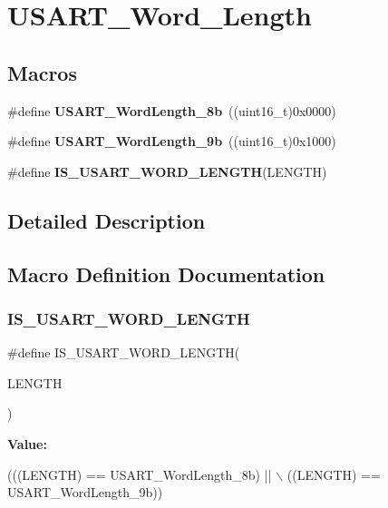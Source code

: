\hypertarget{group___u_s_a_r_t___word___length}{}\section{U\+S\+A\+R\+T\+\_\+\+Word\+\_\+\+Length}
\label{group___u_s_a_r_t___word___length}
\subsection*{Macros}
\begin{DoxyCompactItemize}
\item 
\mbox{\label{group___u_s_a_r_t___word___length_ga08682faddc657df85a93627b5a146c25}} 
\#define {\bfseries U\+S\+A\+R\+T\+\_\+\+Word\+Length\+\_\+8b}~((uint16\+\_\+t)0x0000)
\item 
\mbox{\label{group___u_s_a_r_t___word___length_gae7dd162142660e09e2321aa3f33dc4d2}} 
\#define {\bfseries U\+S\+A\+R\+T\+\_\+\+Word\+Length\+\_\+9b}~((uint16\+\_\+t)0x1000)
\item 
\#define {\bfseries I\+S\+\_\+\+U\+S\+A\+R\+T\+\_\+\+W\+O\+R\+D\+\_\+\+L\+E\+N\+G\+TH}(L\+E\+N\+G\+TH)
\end{DoxyCompactItemize}


\subsection{Detailed Description}


\subsection{Macro Definition Documentation}
\mbox{\label{group___u_s_a_r_t___word___length_ga5b07b29ee91f0bea4c10ec0fd74fbc04}} 
\subsubsection{\texorpdfstring{I\+S\+\_\+\+U\+S\+A\+R\+T\+\_\+\+W\+O\+R\+D\+\_\+\+L\+E\+N\+G\+TH}{IS\_USART\_WORD\_LENGTH}}
{\footnotesize\ttfamily \#define I\+S\+\_\+\+U\+S\+A\+R\+T\+\_\+\+W\+O\+R\+D\+\_\+\+L\+E\+N\+G\+TH(\begin{DoxyParamCaption}\item[{}]{L\+E\+N\+G\+TH }\end{DoxyParamCaption})}

{\bfseries Value\+:}
\begin{DoxyCode}
(((LENGTH) == USART\_WordLength\_8b) || \(\backslash\)
                                      ((LENGTH) == USART\_WordLength\_9b))
\end{DoxyCode}
